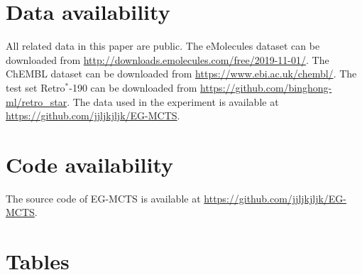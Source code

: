 \documentclass[sn-mathphys,Numbered]{sn-jnl}
\begin{document}
\section{Data availability}
All related data in this paper are public.
The eMolecules dataset can be downloaded from \url{http://downloads.emolecules.com/free/2019-11-01/}.
The ChEMBL dataset can be downloaded from \url{https://www.ebi.ac.uk/chembl/}.
The test set Retro$^*$-190 can be downloaded from \url{https://github.com/binghong-ml/retro_star}.
The data used in the experiment is available at \url{https://github.com/jjljkjljk/EG-MCTS}.

\section{Code availability}
The source code of EG-MCTS is available at \url{https://github.com/jjljkjljk/EG-MCTS}.









\backmatter






\section{Tables}
\end{document}
